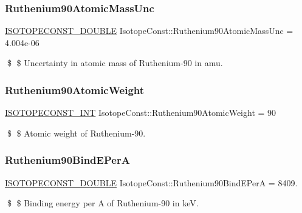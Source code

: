 \subsubsection{\texorpdfstring{Ruthenium90\+Atomic\+Mass\+Unc}{Ruthenium90AtomicMassUnc}}
{\footnotesize\ttfamily \mbox{\hyperlink{group___isotope_const-_macros_ga8f45a7272ce02c0b4c65c44636ed719a}{I\+S\+O\+T\+O\+P\+E\+C\+O\+N\+S\+T\+\_\+\+D\+O\+U\+B\+LE}} Isotope\+Const\+::\+Ruthenium90\+Atomic\+Mass\+Unc = 4.\+004e-\/06}

\$ \$ Uncertainty in atomic mass of Ruthenium-\/90 in amu. \mbox{\label{group___isotope_const-_ruthenium-_ru90_gae461a7e7086bc7fca451e1158ebcd633}} 
\subsubsection{\texorpdfstring{Ruthenium90\+Atomic\+Weight}{Ruthenium90AtomicWeight}}
{\footnotesize\ttfamily \mbox{\hyperlink{group___isotope_const-_macros_ga5f18360b3e99483a35c32d789e62621c}{I\+S\+O\+T\+O\+P\+E\+C\+O\+N\+S\+T\+\_\+\+I\+NT}} Isotope\+Const\+::\+Ruthenium90\+Atomic\+Weight = 90}

\$ \$ Atomic weight of Ruthenium-\/90. \mbox{\label{group___isotope_const-_ruthenium-_ru90_ga4a8884ac6b3df4669f30a10636a86275}} 
\subsubsection{\texorpdfstring{Ruthenium90\+Bind\+E\+PerA}{Ruthenium90BindEPerA}}
{\footnotesize\ttfamily \mbox{\hyperlink{group___isotope_const-_macros_ga8f45a7272ce02c0b4c65c44636ed719a}{I\+S\+O\+T\+O\+P\+E\+C\+O\+N\+S\+T\+\_\+\+D\+O\+U\+B\+LE}} Isotope\+Const\+::\+Ruthenium90\+Bind\+E\+PerA = 8409.}

\$ \$ Binding energy per A of Ruthenium-\/90 in keV. \mbox{\label{group___isotope_const-_ruthenium-_ru90_gae73b6d67f05fc93cf2e02db3ff9dff45}} 
